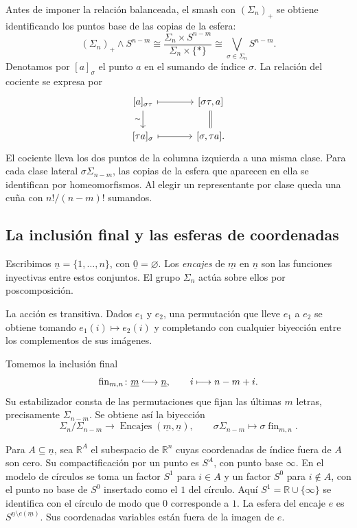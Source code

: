 Antes de imponer la relación balanceada, el smash con $(\Sigma_n)_+$ se obtiene identificando los puntos base de las copias de la esfera:
\[
(\Sigma_n)_+\wedge S^{n-m}
\cong \frac{\Sigma_n\times S^{n-m}}{\Sigma_n\times\{*\}}
\cong\bigvee_{\sigma\in\Sigma_n}S^{n-m}.
\]
Denotamos por $[a]_\sigma$ el punto $a$ en el sumando de índice $\sigma$. La relación del cociente se expresa por
\[
\begin{tikzcd}[column sep=large,row sep=normal]
{[a]_{\sigma\tau}}\arrow[r,mapsto]\arrow[d,"\sim"']&
{[\sigma\tau,a]}\arrow[d,equal]\\
{[\tau a]_\sigma}\arrow[r,mapsto]&{[\sigma,\tau a]}.
\end{tikzcd}
\]
El cociente lleva los dos puntos de la columna izquierda a una misma clase. Para cada clase lateral $\sigma\Sigma_{n-m}$, las copias de la esfera que aparecen en ella se identifican por homeomorfismos. Al elegir un representante por clase queda una cuña con $n!/(n-m)!$ sumandos.

\subsection{La inclusión final y las esferas de coordenadas}

Escribimos $\underline n=\{1,\ldots,n\}$, con $\underline 0=\varnothing$. Los \emph{encajes} de $\underline m$ en $\underline n$ son las funciones inyectivas entre estos conjuntos. El grupo $\Sigma_n$ actúa sobre ellos por poscomposición.

La acción es transitiva. Dados $e_1$ y $e_2$, una permutación que lleve $e_1$ a $e_2$ se obtiene tomando $e_1(i)\mapsto e_2(i)$ y completando con cualquier biyección entre los complementos de sus imágenes.

Tomemos la inclusión final
\[
\operatorname{fin}_{m,n}\colon\underline m\lhook\joinrel\longrightarrow\underline n,
\qquad i\longmapsto n-m+i.
\]
Su estabilizador consta de las permutaciones que fijan las últimas $m$ letras, precisamente $\Sigma_{n-m}$. Se obtiene así la biyección
\[
\Sigma_n/\Sigma_{n-m}\longrightarrow
\operatorname{Encajes}(\underline m,\underline n),
\qquad \sigma\Sigma_{n-m}\longmapsto\sigma\operatorname{fin}_{m,n}.
\]

Para $A\subseteq\underline n$, sea $\mathbb R^A$ el subespacio de $\mathbb R^n$ cuyas coordenadas de índice fuera de $A$ son cero. Su compactificación por un punto es $S^A$, con punto base $\infty$. En el modelo de círculos se toma un factor $S^1$ para $i\in A$ y un factor $S^0$ para $i\notin A$, con el punto no base de $S^0$ insertado como el $1$ del círculo. Aquí $S^1=\mathbb R\cup\{\infty\}$ se identifica con el círculo de modo que $0$ corresponde a $1$. La esfera del encaje $e$ es $S^{\underline n\setminus e(\underline m)}$. Sus coordenadas variables están fuera de la imagen de $e$.

